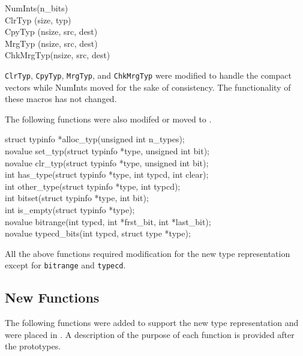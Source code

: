 \goodbreak
\begin{iconcode}
NumInts(n\_bits)\\
ClrTyp (size, typ)\\
CpyTyp (nsize, src, dest)\\
MrgTyp (nsize, src, dest)\\
ChkMrgTyp(nsize, src, dest)\\
\end{iconcode}

\texttt{ClrTyp}, \texttt{CpyTyp}, \texttt{MrgTyp}, and
\texttt{ChkMrgTyp} were modified to handle the compact vectors while
NumInts moved for the sake of consistency. The functionality of these
macros has not changed.

The following functions were also modifed or moved to .

\goodbreak
\begin{iconcode}
struct typinfo *alloc\_typ(unsigned int n\_types);\\
novalue set\_typ(struct typinfo *type, unsigned int bit);\\
novalue clr\_typ(struct typinfo *type, unsigned int bit);\\
int has\_type(struct typinfo *type, int typcd, int clear);\\
int other\_type(struct typinfo *type, int typcd);\\
int bitset(struct typinfo *type, int bit);\\
int is\_empty(struct typinfo *type);\\
novalue bitrange(int typcd, int *frst\_bit, int *last\_bit);\\
novalue typecd\_bits(int typcd, struct type *type);\\
\end{iconcode}


All the above functions required modification for the new type
representation except for \texttt{bitrange} and \texttt{typecd}.

\subsection{New Functions}

The following functions were added to support the new type
representation and were placed in . A description of
the purpose of each function is provided after the prototypes.



